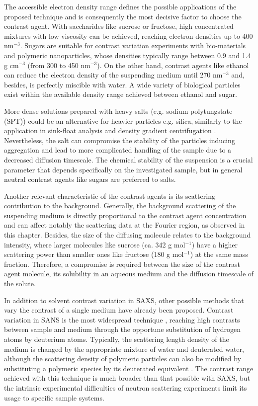 The accessible electron density range defines the possible applications of the proposed technique and is consequently the most decisive factor to choose the contrast agent. With saccharides like sucrose or fructose, high concentrated mixtures with low viscosity can be achieved, reaching electron densities up to 400 nm$^{-3}$. Sugars are suitable for contrast variation experiments with bio-materials and polymeric nanoparticles, whose densities typically range between 0.9 and 1.4 g cm$^{-3}$ (from 300 to 450 nm$^{-3}$). On the other hand, contrast agents like ethanol can reduce the electron density of the suspending medium until 270 nm$^{-3}$ and, besides, is perfectly miscible with water. A wide variety of biological particles exist within the available density range achieved between ethanol and sugar.

More dense solutions prepared with heavy salts (e.g. sodium polytungstate (SPT)) could be an alternative for heavier particles e.g. silica, similarly to the application in sink-float analysis and density gradient centrifugation \citep{rhodes_fine_1991,mitchell_setup_2010}. Nevertheless, the salt can compromise the stability of the particles inducing aggregation and lead to more complicated handling of the sample due to a decreased diffusion timescale. The chemical stability of the suspension is a crucial parameter that depends specifically on the investigated sample, but in general neutral contrast agents like sugars are preferred to salts.

Another relevant characteristic of the contrast agents is its scattering  contribution to the background. Generally, the background scattering of the suspending medium is directly proportional to the contrast agent concentration and can affect notably the scattering data at the Fourier region, as observed in this chapter. Besides, the size of the diffusing molecule relates to the background intensity, where larger molecules like sucrose (ca. 342 g mol$^{-1}$) have a higher scattering power than smaller ones like fructose (180 g mol$^{-1}$) at the same mass fraction. Therefore, a compromise  is required between the size of the contrast agent molecule, its solubility in an aqueous medium and the diffusion timescale of the solute.

In addition to solvent contrast variation in SAXS, other possible methods that vary the contrast of a single medium have already been proposed. Contrast variation in SANS is the most widespread technique \citep{ballauff_analysis_2011, ballauff_saxs_2001-1}, reaching high contrasts between sample and medium through the opportune substitution of hydrogen atoms by deuterium atoms. Typically, the scattering length density of the medium is changed by the appropriate mixture of water and deuterated water, although the scattering density of polymeric particles can also be modified by substituting a polymeric species by its deuterated equivalent \citep{rosenfeldt_distribution_2002}. The contrast range achieved with this technique is much broader than that possible with SAXS, but the intrinsic experimental difficulties of neutron scattering experiments limit its usage to specific sample systems.

